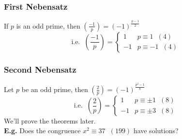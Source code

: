 \documentclass[11pt]{article}
\begin{document}
\subsubsection{First Nebensatz}
\normalsize If $p$ is an odd prime, then $(\frac{-1}{p}) = (-1)^{\frac{p-1}{2}}$
\large
\begin{equation*}
	\text{i.e.} \hspace{7pt} (\frac{-1}{p}) = 
	\begin{cases}
		1 & p \equiv 1\hspace{7pt} (4)\\
		-1 & p \equiv -1 \hspace{7pt} (4)
	\end{cases}
\end{equation*}

\subsubsection{Second Nebensatz}
\normalsize Let $p$ be an odd prime, then $(\frac{2}{p}) = (-1)^{\frac{p^2 - 1}{ 8}}$
\large
\begin{equation*}
	\text{i.e.} \hspace{7pt} (\frac{2}{p}) = 
	\begin{cases}
		1 & p \equiv \pm 1\hspace{7pt} (8)\\
		-1 & p \equiv \pm 3 \hspace{7pt} (8) 
	\end{cases}
\end{equation*}
\normalsize
We'll prove the theorems later. \\[1em]

\textbf{E.g.} Does the congruence $x^2 \equiv 37 \hspace{7pt} (199)$ have solutions?
\end{document}
